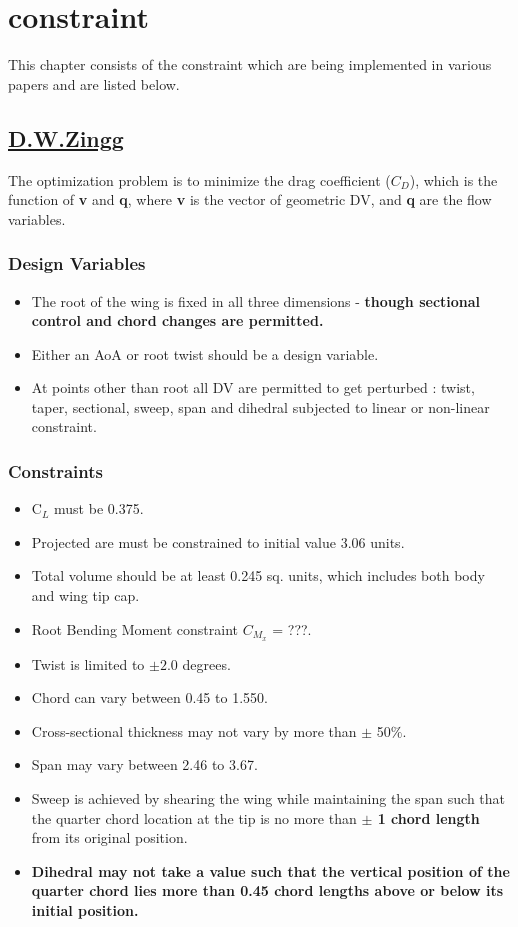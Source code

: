 \chapter{constraint}
This chapter consists of the constraint which are being implemented in various papers and are listed below. 

\section{\underline{D.W.Zingg}}

The optimization problem is to minimize the drag coefficient ($C_D$), which is the function of \textbf{v} and \textbf{q}, where \textbf{v} is the vector of geometric DV, and \textbf{q} are the flow variables.

\subsection{Design Variables}
\begin{itemize}
\item The root of the wing is fixed in all three dimensions - \textbf{though sectional control and chord changes are permitted.}
\item Either an AoA or root twist should be a design variable.
\item At points other than root all DV are permitted to get perturbed : twist, taper, sectional, sweep, span and dihedral subjected to linear or non-linear constraint.
\end{itemize}

\subsection{Constraints}

\begin{itemize}
\item C$_L$ must be 0.375.
\item Projected are must be constrained to initial value 3.06 units.
\item Total volume should be at least 0.245 sq. units, which includes both body and wing tip cap.
\item Root Bending Moment constraint $C_{M_x}$ = ???.
\item Twist is limited to $\pm 2.0 $ degrees.
\item Chord can vary between 0.45 to 1.550.
\item Cross-sectional thickness may not vary by more than $\pm$ 50$\%$.
\item Span may vary between 2.46 to 3.67.
\item Sweep is achieved by shearing the wing while maintaining the span such that the quarter chord location at the tip is no more than \textbf{$\pm$ 1 chord length} from its original position.
\item \textbf{Dihedral may not take a value such that the vertical position of the quarter chord lies more than 0.45 chord lengths above or below its initial position.}
\end{itemize}

